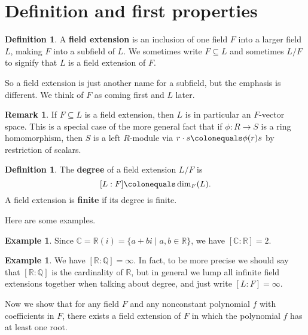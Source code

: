 \documentclass[12pt]{report}
\numberwithin{equation}{section}
\numberwithin{theorem}{chapter}
\theoremstyle{definition}
\newtheorem{definition}[theorem]{Definition}
\newtheorem{example}[theorem]{Example}
\newtheorem*{basic properties}{Basic Properties}
\newtheorem*{Important Remark}{Important Remark}
\newtheorem{remark}[theorem]{Remark}
\newcommand{\df}[1]{{\bf #1}\index{#1}}
\newcommand{\C}{\mathbb{C}}
\begin{document}
\section{Definition and first properties}


\begin{definition} 
A \df{field extension} is an inclusion of one field $F$ into a larger field $L$, making $F$ into a subfield of $L$. We sometimes write $F \subseteq L$ and sometimes $L/F$ to signify that $L$ is a field extension of $F$.
\end{definition}

So a field extension is just another name for a subfield, but the emphasis is different. We think of $F$ as coming first and $L$ later. 

\begin{remark} 
If $F \subseteq L$ is a field extension, then $L$ is in particular an $F$-vector space. This is a special case of the more general fact that if $\phi\!: R \to S$ is a ring homomorphism, then $S$ is a left $R$-module via $r \cdot s \colonequals \phi(r)s$ by restriction of scalars.
\end{remark}


\begin{definition} 
The {\bf degree} of a field extension $L/F$ is
$$[L:F] \colonequals \dim_F(L).$$
A field extension is {\bf finite} if its degree is finite.\index{$[L:F]$}
\end{definition}

Here are some examples.

\begin{example} 
Since $\C = \mathbb{R}(i) = \{a+bi\mid a,b\in \mathbb{R}\}$, we have $[\C: \mathbb{R}] = 2$.
\end{example}

\begin{example}
We have $[\mathbb{R}:\mathbb{Q}] = \infty$. In fact, to be more precise we should say that $[\mathbb{R}:\mathbb{Q}]$ is the cardinality of $\mathbb{R}$, but in general we lump all infinite field extensions together when talking about degree, and just write $[L : F] = \infty$.
\end{example}


Now we show that for any field $F$ and any nonconstant polynomial $f$ with coefficients in $F$, there exists a field extension of $F$ in which the polynomial $f$ has at least one root.
\end{document}

